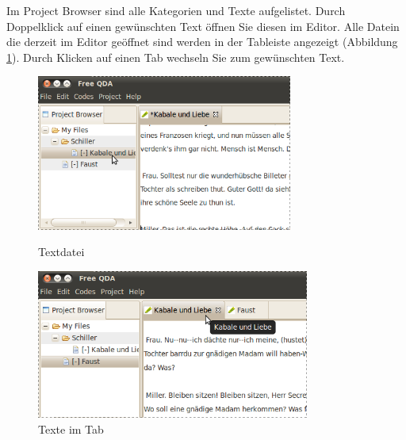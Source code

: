 Im Project Browser sind alle Kategorien und Texte aufgelistet. Durch Doppelklick auf einen gewünschten Text %
öffnen Sie diesen im Editor. Alle Datein die derzeit im Editor geöffnet sind werden in der Tableiste angezeigt (Abbildung \ref{fig:texttab}). Durch Klicken auf einen %
Tab wechseln Sie zum gewünschten Text. 
\begin{figure}[!hb]
\begin{minipage}[!hb!]{0.5\textwidth}
	\centering
	 \includegraphics[width=0.75\textwidth]{img/createnewtext5}
	\caption{Textdatei}
	\label{fig:newtext5}
\end{minipage}
\hfill
\begin{minipage}[!hb!]{0.5\textwidth}
	\centering
	 \includegraphics[width=0.8\textwidth]{img/texttab}
	\caption{Texte im Tab}
	\label{fig:texttab}
\end{minipage}
\end{figure}
